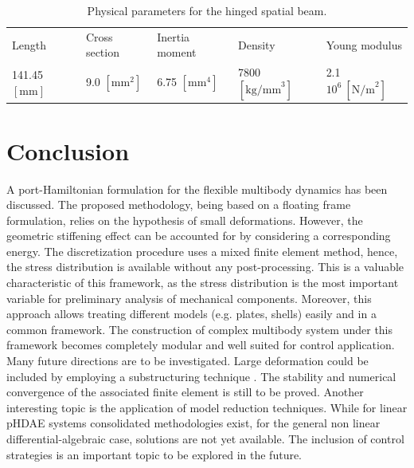 \documentclass{svjour3}                     %
\begin{document}
\begin{table}[tb]
	\caption{Physical parameters for the hinged spatial beam.}
	\label{tab:data_3Dbeam}       %
	\begin{tabular}{lllll}
		\hline\noalign{\smallskip}
		Length & Cross section & Inertia moment & Density & Young modulus \\
		\noalign{\smallskip}\hline\noalign{\smallskip}
		141.45 $[\mathrm{mm}]$ & 9.0 $[\mathrm{mm}^2]$ & 6.75 $[\mathrm{mm}^4]$ & 7800 $[\mathrm{kg/mm}^3]$ & 2.1 $10^6 \ [\mathrm{N/m}^2]$  \\
		\hline
	\end{tabular}
\end{table}


\section{Conclusion}
A port-Hamiltonian formulation for the flexible multibody dynamics has been discussed. The proposed methodology, being based on a floating frame formulation, relies on the hypothesis of small deformations. However, the geometric stiffening effect can be accounted for by considering a corresponding energy. The discretization procedure uses a mixed finite element method, hence, the stress distribution is available without any post-processing. This is a valuable characteristic of this framework, as the stress distribution is the most important variable for preliminary analysis of mechanical components. Moreover, this approach allows treating different models (e.g. plates, shells) easily and in a common framework. The construction of complex multibody system under this framework becomes completely modular and well suited for control application.  \\
Many future directions are to be investigated. Large deformation could be included by employing a substructuring technique \cite{SHABANA_substructure}.
The stability and numerical convergence of the associated finite element is still to be proved. Another interesting topic is the application of model reduction techniques. While for linear pHDAE systems consolidated methodologies exist, for the general non linear differential-algebraic case, solutions are not yet available. The inclusion of control strategies is an important topic to be explored in the future.


\end{document}
